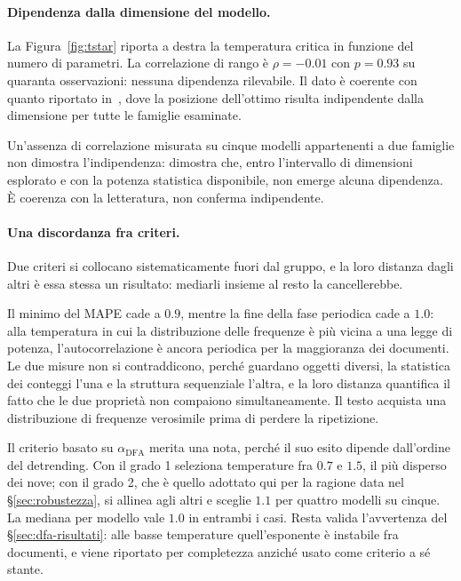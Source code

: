 \paragraph{Dipendenza dalla dimensione del modello.}
La Figura~\ref{fig:tstar} riporta a destra la temperatura critica in funzione
del numero di parametri. La correlazione di rango è $\rho = -0.01$ con
$p = 0.93$ su quaranta osservazioni: nessuna dipendenza rilevabile. Il dato è
coerente con quanto riportato in~\cite{mikhaylovskiy2025zipf}, dove la posizione
dell'ottimo risulta indipendente dalla dimensione per tutte le famiglie
esaminate.

Un'assenza di correlazione misurata su cinque modelli appartenenti a due
famiglie non dimostra l'indipendenza: dimostra che, entro l'intervallo di
dimensioni esplorato e con la potenza statistica disponibile, non emerge
alcuna dipendenza. È coerenza con la letteratura, non conferma indipendente.

\paragraph{Una discordanza fra criteri.}
Due criteri si collocano sistematicamente fuori dal gruppo, e la loro distanza
dagli altri è essa stessa un risultato: mediarli insieme al resto la
cancellerebbe.

Il minimo del MAPE cade a $0.9$, mentre la fine della fase periodica cade a
$1.0$: alla temperatura in cui la distribuzione delle frequenze è più vicina a
una legge di potenza, l'autocorrelazione è ancora periodica per la maggioranza
dei documenti. Le due misure non si contraddicono, perché guardano oggetti
diversi, la statistica dei conteggi l'una e la struttura sequenziale l'altra,
e la loro distanza quantifica il fatto che le due proprietà non compaiono
simultaneamente. Il testo acquista una distribuzione di frequenze verosimile
prima di perdere la ripetizione.

Il criterio basato su $\alpha_{\mathrm{DFA}}$ merita una nota, perché il suo
esito dipende dall'ordine del detrending. Con il grado 1 seleziona temperature
fra $0.7$ e $1.5$, il più disperso dei nove; con il grado 2, che è quello
adottato qui per la ragione data nel §\ref{sec:robustezza}, si allinea agli
altri e sceglie $1.1$ per quattro modelli su cinque. La mediana per modello vale
$1.0$ in entrambi i casi. Resta valida l'avvertenza del
§\ref{sec:dfa-risultati}: alle basse temperature quell'esponente è instabile
fra documenti, e viene riportato per completezza anziché usato come criterio a
sé stante.

